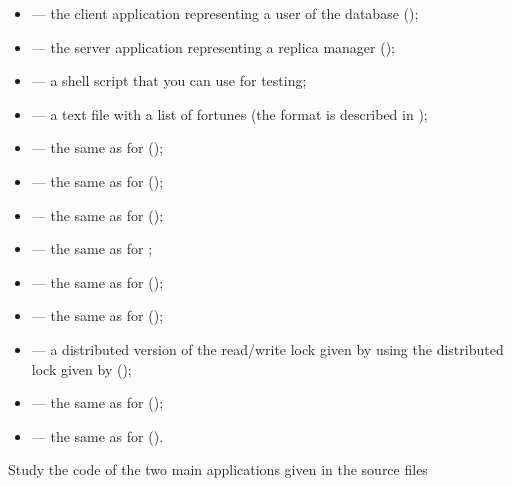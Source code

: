 \documentclass[a4paper]{article}
\begin{document}
\begin{itemize}

  \item {} --- the client application representing a user
  of the database (\leave);

  \item {} --- the server application representing a
  replica manager (\fix);

  \item {} --- a shell script that you can use for testing;

  \item {} --- a text file with a list of fortunes
  (the format is described in );

  \item {} --- the same as for
   (\leave);

  \item {} --- the same as for 
  (\overwrite);

  \item {} --- the same as for 
  (\overwrite);

  \item {} --- the same as for ;

  \item {} --- the same as for 
  (\overwrite);

  \item {} --- the same as for 
  (\overwrite);

  \item {} --- a
  distributed version of the read/write lock given by 
  using the distributed lock given by  (\fix);

  \item {} --- the same as for
   (\overwrite);

  \item {} --- the same as for
   (\leave).

\end{itemize}
Study the code of the two main applications given in the source files
\end{document}
